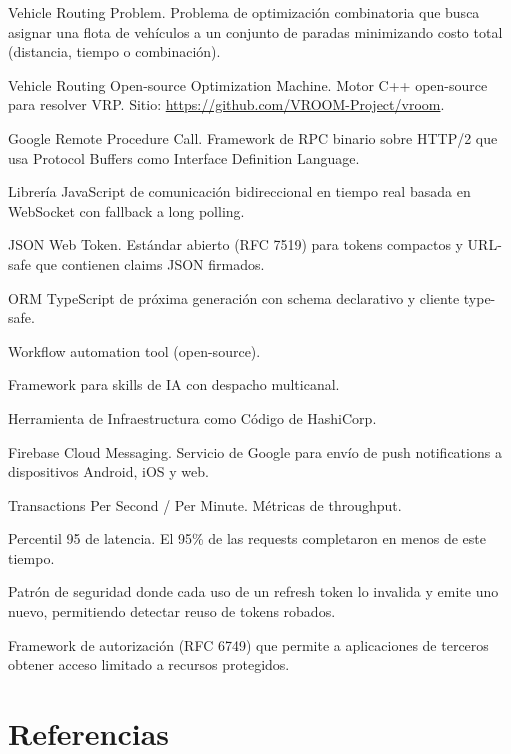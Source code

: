 \documentclass[12pt,a4paper,oneside]{article}
\begin{document}
\begin{description}[leftmargin=*]
  \item[\textbf{VRP}] Vehicle Routing Problem. Problema de optimizaci\'on combinatoria que busca asignar una flota de veh\'iculos a un conjunto de paradas minimizando costo total (distancia, tiempo o combinaci\'on).
  \item[\textbf{VROOM}] Vehicle Routing Open-source Optimization Machine. Motor C++ open-source para resolver VRP. Sitio: \url{https://github.com/VROOM-Project/vroom}.
  \item[\textbf{gRPC}] Google Remote Procedure Call. Framework de RPC binario sobre HTTP/2 que usa Protocol Buffers como Interface Definition Language.
  \item[\textbf{Socket.io}] Librer\'ia JavaScript de comunicaci\'on bidireccional en tiempo real basada en WebSocket con fallback a long polling.
  \item[\textbf{JWT}] JSON Web Token. Est\'andar abierto (RFC 7519) para tokens compactos y URL-safe que contienen claims JSON firmados.
  \item[\textbf{Prisma}] ORM TypeScript de pr\'oxima generaci\'on con schema declarativo y cliente type-safe.
  \item[\textbf{n8n}] Workflow automation tool (open-source).
  \item[\textbf{OpenClaw}] Framework para skills de IA con despacho multicanal.
  \item[\textbf{Terraform}] Herramienta de Infraestructura como C\'odigo de HashiCorp.
  \item[\textbf{FCM}] Firebase Cloud Messaging. Servicio de Google para env\'io de push notifications a dispositivos Android, iOS y web.
  \item[\textbf{TPS / TPM}] Transactions Per Second / Per Minute. M\'etricas de throughput.
  \item[\textbf{P95}] Percentil 95 de latencia. El 95\% de las requests completaron en menos de este tiempo.
  \item[\textbf{Refresh Token Rotation}] Patr\'on de seguridad donde cada uso de un refresh token lo invalida y emite uno nuevo, permitiendo detectar reuso de tokens robados.
  \item[\textbf{OAuth 2.0}] Framework de autorizaci\'on (RFC 6749) que permite a aplicaciones de terceros obtener acceso limitado a recursos protegidos.
\end{description}

\section{Referencias}
\end{document}
